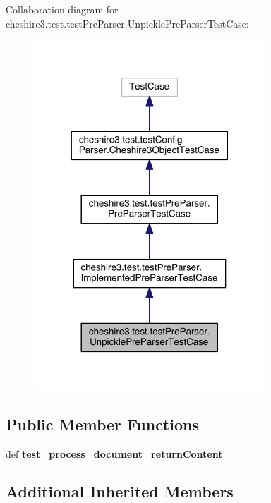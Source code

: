 Collaboration diagram for cheshire3.\-test.\-test\-Pre\-Parser.\-Unpickle\-Pre\-Parser\-Test\-Case\-:
\nopagebreak
\begin{figure}[H]
\begin{center}
\leavevmode
\includegraphics[width=246pt]{classcheshire3_1_1test_1_1test_pre_parser_1_1_unpickle_pre_parser_test_case__coll__graph}
\end{center}
\end{figure}
\subsection*{Public Member Functions}
\begin{DoxyCompactItemize}
\item 
\hypertarget{classcheshire3_1_1test_1_1test_pre_parser_1_1_unpickle_pre_parser_test_case_a16f25ef8c7bab4683895a70c2ea2d675}{def {\bfseries test\-\_\-process\-\_\-document\-\_\-return\-Content}}\label{classcheshire3_1_1test_1_1test_pre_parser_1_1_unpickle_pre_parser_test_case_a16f25ef8c7bab4683895a70c2ea2d675}

\end{DoxyCompactItemize}
\subsection*{Additional Inherited Members}



